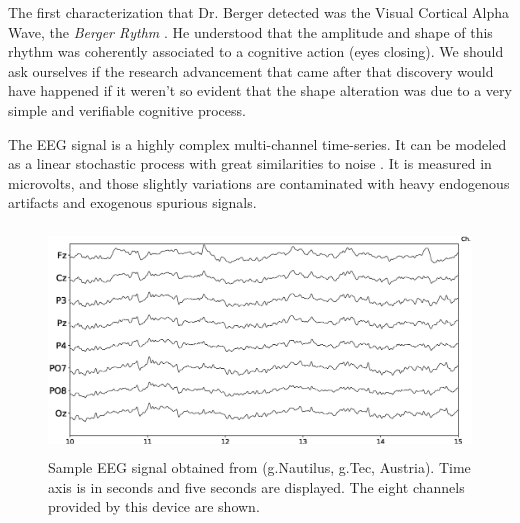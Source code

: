 

The first characterization that Dr. Berger detected was the Visual Cortical Alpha Wave, the \textit{Berger Rythm} \cite{Jansen1991}.  He understood that the amplitude and shape of this rhythm was coherently associated to a cognitive action (eyes closing).  
We should ask ourselves if the research advancement that came after that discovery would have happened if it weren't so evident that the shape alteration was due to a very simple and verifiable cognitive process.

The EEG signal is a highly complex multi-channel time-series.  It can be modeled as a linear stochastic process with great similarities to noise \cite{Thakor2004}.  It is measured in microvolts, and those slightly variations are contaminated with heavy endogenous artifacts and exogenous spurious signals.  
 
\begin{figure}[]
\centering
\includegraphics[height=6cm,width=14cm]{images/sampleeeg.eps}
\caption{Sample EEG signal obtained from (g.Nautilus, g.Tec, Austria). Time axis is in seconds and five seconds are displayed.  The eight channels provided by this device are shown.}
\label{fig:sampleeeg}
\end{figure}


